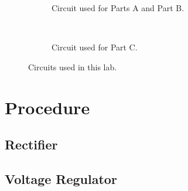 \documentclass{article}
\begin{document}
\begin{figure}[hbtp]
  \centering
  \begin{subfigure}[b]{0.4\textwidth}
    \caption{\label{fig:circuit1} Circuit used for Parts A and Part B.}
  \end{subfigure}%
  ~
  \begin{subfigure}[b]{0.6\textwidth}
    \caption{\label{fig:circuit2} Circuit used for Part C.}
  \end{subfigure}
  \caption{\label{fig:circuits_tested} Circuits used in this lab.}
\end{figure}

\section{Procedure}
\label{sec:procedure}

\subsection{Rectifier}
\label{sec:rectifier}


\subsection{Voltage Regulator}
\label{sec:volt_reg}

\end{document}

